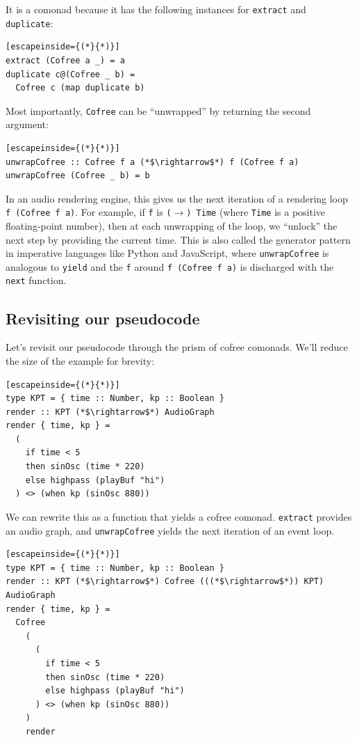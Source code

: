 \documentclass{article}
\begin{document}
It is a comonad because it has the following instances for \texttt{extract} and \texttt{duplicate}:

\lstset{language=Haskell, style=psstyle}
\begin{lstlisting}[escapeinside={(*}{*)}]
extract (Cofree a _) = a
duplicate c@(Cofree _ b) =
  Cofree c (map duplicate b)
\end{lstlisting}

Most importantly, \texttt{Cofree} can be ``unwrapped'' by returning the second argument:

\lstset{language=Haskell, style=psstyle}
\begin{lstlisting}[escapeinside={(*}{*)}]
unwrapCofree :: Cofree f a (*$\rightarrow$*) f (Cofree f a)
unwrapCofree (Cofree _ b) = b
\end{lstlisting}

In an audio rendering engine, this gives us the next iteration of a rendering loop \texttt{f (Cofree f a)}. For example, if \texttt{f} is \texttt{($\rightarrow$) Time} (where \texttt{Time} is a positive floating-point number), then at each unwrapping of the loop, we ``unlock'' the next step by providing the current time. This is also called the generator pattern in imperative languages like Python and JavaScript, where \texttt{unwrapCofree} is analogous to \texttt{yield} and the \texttt{f} around \texttt{f (Cofree f a)} is discharged with the \texttt{next} function.

\subsection{Revisiting our pseudocode}

Let's revisit our pseudocode through the prism of cofree comonads. We'll reduce the size of the example for brevity:

\lstset{language=Haskell, style=psstyle}
\begin{lstlisting}[escapeinside={(*}{*)}]
type KPT = { time :: Number, kp :: Boolean }
render :: KPT (*$\rightarrow$*) AudioGraph
render { time, kp } =
  (
    if time < 5
    then sinOsc (time * 220)
    else highpass (playBuf "hi")
  ) <> (when kp (sinOsc 880))
\end{lstlisting}

We can rewrite this as a function that yields a cofree comonad. \texttt{extract} provides an audio graph, and \texttt{unwrapCofree} yields the next iteration of an event loop.

\lstset{language=Haskell, style=psstyle}
\begin{lstlisting}[escapeinside={(*}{*)}]
type KPT = { time :: Number, kp :: Boolean }
render :: KPT (*$\rightarrow$*) Cofree (((*$\rightarrow$*)) KPT) AudioGraph
render { time, kp } =
  Cofree
    (
      (
        if time < 5
        then sinOsc (time * 220)
        else highpass (playBuf "hi")
      ) <> (when kp (sinOsc 880))
    )
    render
\end{lstlisting}
\end{document}
